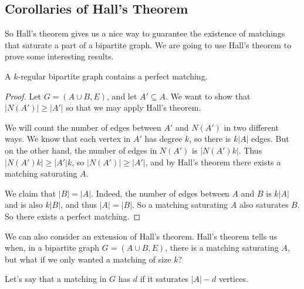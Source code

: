 \documentclass[a4paper]{scrartcl}
\begin{document}



\subsection{Corollaries of Hall's Theorem}

So Hall's theorem gives us a nice way to guarantee the existence of matchings that saturate a part of a bipartite graph. We are going to use Hall's theorem to prove some interesting results.


\begin{corollary}
	A $k$-regular bipartite graph contains a perfect matching.
\end{corollary}
\begin{proof}
	Let $G = (A \cup B, E)$, and let $A' \subseteq A$. We want to show that $|N(A')| \geq |A'|$ so that we may apply Hall's theorem.

	We will count the number of edges between $A'$ and $N(A')$ in two different ways. We know that each vertex in $A'$ has degree $k$, so there is $k|A|$ edges. But on the other hand, the number of edges in $N(A')$ is $|N(A')k|$. Thus $|N(A')k| \geq |A'|k$, so $|N(A')| \geq |A'|$, and by Hall's theorem
	there exists a matching saturating $A$.

	We claim that $|B| = |A|$. Indeed, the number of edges between $A$ and $B$ is $k|A|$ and is also $k|B|$, and thus $|A| = |B|$. So a matching saturating $A$ also saturates $B$. So there exists a perfect matching.
\end{proof}

We can also consider an extension of Hall's theorem. Hall's theorem tells us when, in a bipartite graph $G = (A \cup B, E)$, there is a matching saturating $A$, but what if we only wanted a matching of size $k$?

Let's say that a matching in $G$ has  $d$ if it saturates $|A| - d$ vertices. 
\end{document}
